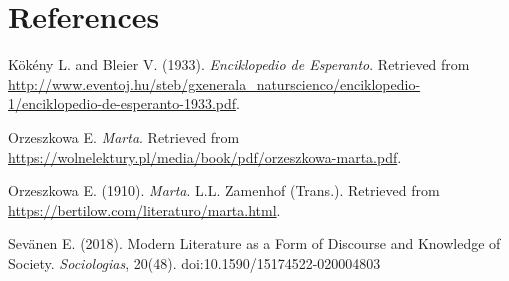 \chapter*{References}

Kökény L. and Bleier V. (1933). \textit{Enciklopedio de Esperanto}. Retrieved from \url{http://www.eventoj.hu/steb/gxenerala_naturscienco/enciklopedio-1/enciklopedio-de-esperanto-1933.pdf}.

Orzeszkowa E. \textit{Marta}. Retrieved from \url{https://wolnelektury.pl/media/book/pdf/orzeszkowa-marta.pdf}.

Orzeszkowa E. (1910). \textit{Marta}. L.L. Zamenhof (Trans.). Retrieved from \url{https://bertilow.com/literaturo/marta.html}.

Sevänen E. (2018). Modern Literature as a Form of Discourse and Knowledge of Society. \textit{Sociologias}, 20(48). doi:10.1590/15174522-020004803